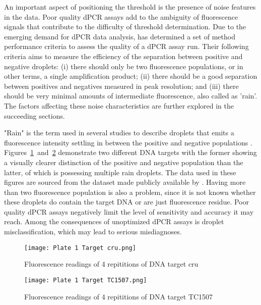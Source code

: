 An important aspect of positioning the threshold is the presence of noise features in the data. Poor quality dPCR assays add to the ambiguity of fluorescence signals that contribute to the difficulty of threshold determination. Due to the emerging demand for dPCR data analysis,  has determined a set of method performance criteria to assess the quality of a dPCR assay run. Their following criteria aims to measure the efficiency of the separation between positive and negative droplets: (i) there should only be two fluorescence populations, or in other terms, a single amplification product; (ii) there should be a good separation between positives and negatives measured in peak resolution; and (iii) there should be very minimal amounts of intermediate fluorescence, also called as 'rain'. The factors affecting these noise characteristics are further explored in the succeeding sections. 

"Rain" is the term used in several studies to describe droplets that emits a fluorescence intensity settling in between the positive and negative populations \cite{Lievens2016, Trypsteen2015, Witte2016, Dreo2014, Brink2018, Attali2016}. Figures \ref{fig:plate1cru} and \ref{fig:plate1tc1507} demonstrate two different DNA targets with the former showing a visually clearer distinction of the positive and negative population than the latter, of which is possessing multiple rain droplets. The data used in these figures are sourced from the dataset made publicly available by . Having more than two fluorescence population is also a problem, since it is not known whether these droplets do contain the target DNA or are just fluorescence residue. Poor quality dPCR assays negatively limit the level of sensitivity and accuracy it may reach. Among the consequences of unoptimized dPCR assays is droplet misclassification, which may lead to serious misdiagnoses.

\begin{figure}[h]
    \centering
    \texttt{[image: Plate 1 Target cru.png]}
    \caption{Fluorescence readings of 4 repititions of DNA target cru}
        \label{fig:plate1cru}
\end{figure}

\begin{figure}[h]
    \centering
    \texttt{[image: Plate 1 Target TC1507.png]}
    \caption{Fluorescence readings of 4 repititions of DNA target TC1507}
        \label{fig:plate1tc1507}
\end{figure}

